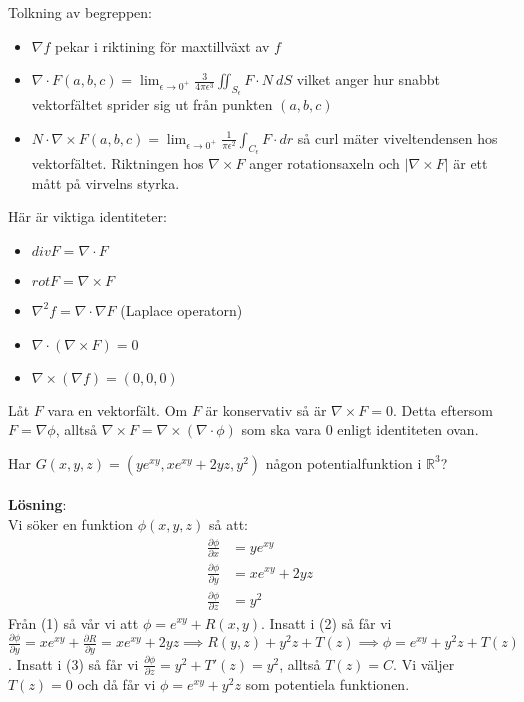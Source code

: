 \documentclass{report}
\begin{document}
\noindent
Tolkning av begreppen:
\begin{itemize}
	\item $ \nabla f $ pekar i riktining för maxtillväxt av $ f $ 
	\item $ \nabla \cdot F(a,b,c) = \lim_{ \epsilon \to 0^+} \frac{3}{4\pi \epsilon^3} \iint_{S_{\epsilon}}^{} F \cdot N \: dS  $ vilket anger hur snabbt vektorfältet sprider sig ut från punkten $ (a,b,c) $
	\item $ N \cdot \nabla \times F(a,b,c) = \lim_{ \epsilon \to 0^+} \frac{1}{\pi \epsilon^2} \int_{C_{\epsilon}}^{} F \cdot dr  $ så curl mäter viveltendensen hos vektorfältet. Riktningen hos $ \nabla \times F $ anger rotationsaxeln och $ | \nabla \times F| $ är ett mått på virvelns styrka. 
\end{itemize}
Här är viktiga identiteter:
\begin{itemize}
	\item $ div F = \nabla \cdot F $
	\item $ rot F = \nabla \times F $
	\item $ \nabla ^2 f = \nabla \cdot \nabla F $ (Laplace operatorn)
	\item $ \nabla \cdot ( \nabla \times F) = 0 $
	\item $ \nabla \times ( \nabla f) = (0,0,0) $ 
\end{itemize}

{
Låt $ F $ vara en vektorfält. Om $ F $ är konservativ så är $ \nabla \times F = 0 $. Detta eftersom $ F = \nabla \phi $, alltså $ \nabla \times F = \nabla \times  ( \nabla \cdot \phi) $ som ska vara 0 enligt identiteten ovan.
}


\ex{}
{
	Har $ G(x,y,z) = (ye^{xy}, xe^{xy}+2yz,y^2) $ någon potentialfunktion i $ \mathbb{R}^3 $?\\\\

\textbf{Lösning}:\\
Vi söker en funktion $ \phi(x,y,z) $ så att:
\begin{align}
	\frac{\partial \phi}{\partial x } &= ye^{xy}\\
	\frac{\partial \phi }{\partial y} &= xe^{xy}+2yz\\
	\frac{\partial \phi }{\partial z } &= y^2 
\end{align}
Från (1) så vår vi att $ \phi = e^{xy} + R(x,y) $. Insatt i (2) så får vi $ \frac{\partial \phi }{\partial y } =xe^{xy} + \frac{\partial R }{\partial y } = xe^{xy} + 2yz \implies R(y,z) + y^2z + T(z) \implies \phi = e^{xy} + y^2z + T(z) $. Insatt i (3) så får vi $ \frac{\partial \phi }{\partial z } = y^2+T'(z) = y^2 $, alltså $ T(z) = C $. Vi väljer $ T(z) = 0 $ och då får vi $ \phi = e^{xy} + y^2z $ som potentiela funktionen.   
}
\end{document}
